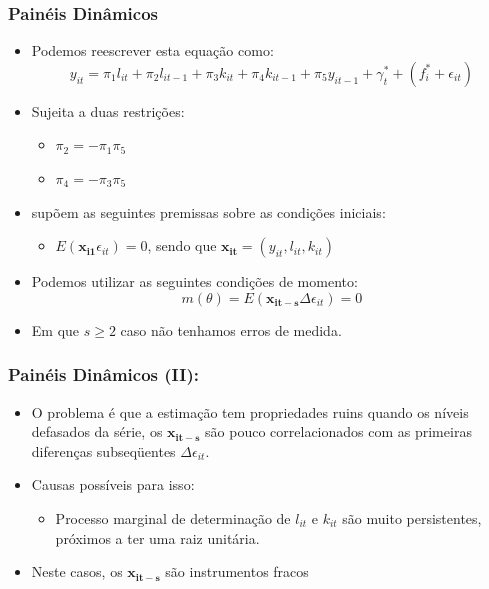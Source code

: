 \documentclass{beamer}
\begin{document}
\begin{frame}\frametitle{Painéis Dinâmicos}

\begin{itemize}
\item Podemos reescrever esta equação como:
\[
y_{it}=\pi_{1}l_{it}+\pi_{2}l_{it-1}+\pi_{3}k_{it}+\pi_{4}k_{it-1}+\pi_{5}y_{it-1}+\gamma_{t}^{*}+(f_{i}^{*}+\epsilon_{it})
\]
\item Sujeita a duas restrições:

\begin{itemize}
\item $\pi_{2}=-\pi_{1}\pi_{5}$
\item $\pi_{4}=-\pi_{3}\pi_{5}$
\end{itemize}
\item \citet{Arellano1991} supõem as seguintes premissas sobre as condições
iniciais:

\begin{itemize}
\item $E(\mathbf{x_{i1}}\epsilon_{it})=0$, sendo que $\mathbf{x_{it}}=(y_{it},l_{it},k_{it})$
\end{itemize}
\item Podemos utilizar as seguintes condições de momento:
\[
m(\theta)=E(\mathbf{x_{it-s}}\Delta\epsilon_{it})=0
\]
\item Em que $s\geq2$ caso não tenhamos erros de medida.
\end{itemize}
\end{frame}

\begin{frame}\frametitle{Painéis Dinâmicos (II):}

\begin{itemize}
\item O problema é que a estimação tem propriedades ruins quando os níveis
defasados da série, os $\mathbf{x_{it-s}}$ são pouco correlacionados
com as primeiras diferenças subseqüentes $\Delta\epsilon_{it}$.
\item Causas possíveis para isso:

\begin{itemize}
\item Processo marginal de determinação de $l_{it}$ e $k_{it}$ são muito
persistentes, próximos a ter uma raiz unitária.
\end{itemize}
\item Neste casos, os $\mathbf{x_{it-s}}$ são instrumentos fracos
\end{itemize}
\end{frame}
\end{document}
